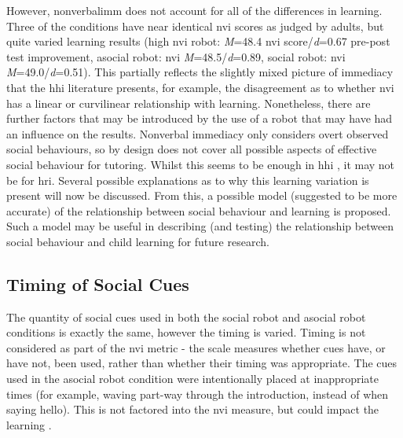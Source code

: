 However, \gls{nonverbalimm} does not account for all of the differences in \gls{learning}. Three of the conditions have near identical \acrshort{nvi} scores as judged by adults, but quite varied \gls{learning} results (high \acrshort{nvi} robot: \textit{M}=48.4 \acrshort{nvi} score/\textit{d}=0.67 pre-post test improvement, asocial robot: \acrshort{nvi} \textit{M}=48.5/\textit{d}=0.89, social robot: \acrshort{nvi} \textit{M}=49.0/\textit{d}=0.51). This partially reflects the slightly mixed picture of immediacy that the \acrshort{hhi} literature presents, for example, the disagreement as to whether \acrshort{nvi} has a linear \citep{christensen1998linear} or curvilinear \citep{comstock1995food} relationship with \gls{learning}. Nonetheless, there are further factors that may be introduced by the use of a robot that may have had an influence on the results. Nonverbal immediacy only considers overt observed social behaviours, so by design does not cover all possible aspects of effective social behaviour for tutoring. Whilst this seems to be enough in \acrshort{hhi} \citep{witt2004meta}, it may not be for \acrshort{hri}. Several possible explanations as to why this \gls{learning} variation is present will now be discussed. From this, a possible model (suggested to be more accurate) of the relationship between social behaviour and \gls{learning} is proposed. Such a model may be useful in describing (and testing) the relationship between social behaviour and child \gls{learning} for future research.

\subsection{Timing of Social Cues}
The quantity of social cues used in both the social robot and asocial robot conditions is exactly the same, however the timing is varied. Timing is not considered as part of the \acrshort{nvi} metric - the scale measures whether cues have, or have not, been used, rather than whether their timing was appropriate. The cues used in the asocial robot condition were intentionally placed at inappropriate times (for example, waving part-way through the introduction, instead of when saying hello). This is not factored into the \acrshort{nvi} measure, but could impact the \gls{learning} \citep{nussbaum1992effective}.

